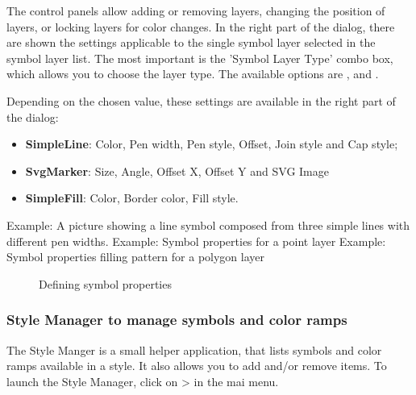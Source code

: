 The control panels allow adding or removing layers, changing the position of layers, 
or locking layers for color changes. In the right part of the dialog, there are 
shown the settings applicable to the single symbol layer selected in the symbol 
layer list. The most important is the 'Symbol Layer Type' combo box, which allows 
you to choose the layer type. The available options are , 
 and . 

Depending on the chosen value, these settings are available in the right part 
of the dialog:

\begin{itemize}
\item \textbf{SimpleLine}: Color, Pen width, Pen style, Offset, Join style and Cap style; 
\item \textbf{SvgMarker}: Size, Angle, Offset X, Offset Y and SVG Image
\item \textbf{SimpleFill}: Color, Border color, Fill style. 
\end{itemize}

Example: A picture showing a line symbol composed from three simple lines with different pen widths. 
Example: Symbol properties for a point layer
Example: Symbol properties filling pattern for a polygon layer

\begin{figure}[h]
\centering
\caption{Defining symbol properties \nixcaption}
   \goodgap
   \goodgap
\end{figure}

\subsubsection{Style Manager to manage symbols and color ramps}

The Style Manger is a small helper application, that lists symbols and color 
ramps available in a style. It also allows you to add and/or remove items. To 
launch the Style Manager, click on  >  in the mai menu.

